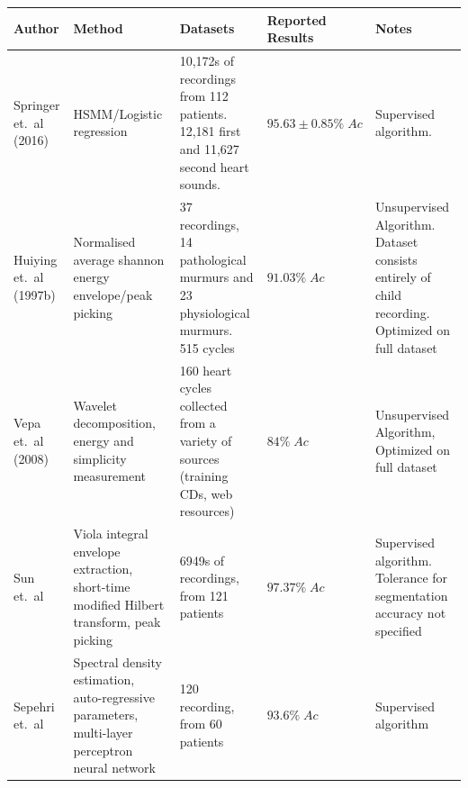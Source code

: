 \documentclass[titlepage, 12pt]{scrartcl} \usepackage{enumitem}
\newcommand{\dtoprule}{\specialrule{1pt}{0pt}{1.4pt}%
            \specialrule{1pt}{0pt}{\belowrulesep}%
            }
\begin{document}
\begin{landscape}
\begin{table}[htbp]
     \label{SegmentationTable}
\footnotesize
{}
\doublespacing
\begin{tabulary}{\linewidth}{LLLLL}
\dtoprule
Author                 & Method                                                                                         & Datasets                                                                                       & \mbox{Reported} Results         & Notes                                                                                            \\ \midrule
Springer et.\ al (2016) & HSMM/Logistic regression                                                                       & 10,172s of recordings from 112 patients. 12,181 first and 11,627 second heart sounds.          & $95.63\pm0.85\%\;Ac$				& Supervised algorithm.                                                                            \\
Huiying et.\ al (1997b) & Normalised average shannon energy envelope/peak picking                                        & 37 recordings, 14 pathological murmurs and 23 physiological murmurs. 515 cycles                & $91.03\%\;Ac$              & Unsupervised Algorithm.  Dataset consists entirely of child recording. Optimized on full dataset \\
Vepa et.\ al (2008)     & Wavelet decomposition, energy and simplicity measurement                                       & 160 heart cycles collected from a variety of sources (training CDs, web resources)             & $84\%\;Ac$                 & Unsupervised Algorithm, Optimized on full dataset                                                \\
Sun et.\ al             & Viola integral envelope extraction, short-time modified Hilbert transform, peak picking        & 6949s of recordings, from 121 patients                                                         & $97.37\%\;Ac$              & Supervised algorithm. Tolerance for segmentation accuracy not specified                          \\
Sepehri et.\ al         & Spectral density estimation, auto-regressive parameters, multi-layer perceptron neural network & 120 recording, from 60 patients                                                                & $93.6\%\;Ac$               & Supervised algorithm                                                                             \\

\end{tabulary}
\end{table}
\end{landscape}
\end{document}
